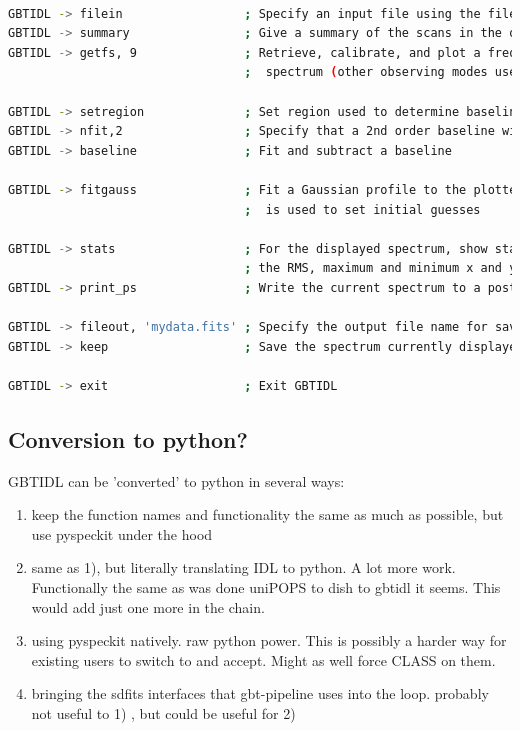 \documentclass[12pt,a4paper]{article}
\begin{document}
\begin{lstlisting}[language=bash]
% gbtidl                         ; Start GBTIDL from the unix prompt

GBTIDL -> filein                 ; Specify an input file using the file selection GUI
GBTIDL -> summary                ; Give a summary of the scans in the opened data file
GBTIDL -> getfs, 9               ; Retrieve, calibrate, and plot a frequency switched  
                                 ;  spectrum (other observing modes use different commands)

GBTIDL -> setregion              ; Set region used to determine baseline
GBTIDL -> nfit,2                 ; Specify that a 2nd order baseline will be used
GBTIDL -> baseline               ; Fit and subtract a baseline

GBTIDL -> fitgauss               ; Fit a Gaussian profile to the plotted spectrum.  The mouse
                                 ;  is used to set initial guesses

GBTIDL -> stats                  ; For the displayed spectrum, show statistics such as
                                 ; the RMS, maximum and minimum x and y values
GBTIDL -> print_ps               ; Write the current spectrum to a postscript file

GBTIDL -> fileout, 'mydata.fits' ; Specify the output file name for saved data
GBTIDL -> keep                   ; Save the spectrum currently displayed
		    
GBTIDL -> exit                   ; Exit GBTIDL

\end{lstlisting}

\subsection{Conversion to python?}

GBTIDL can be 'converted' to python in several ways:

\begin{enumerate}
\item
  keep the function names and functionality the same as much as possible,
    but use pyspeckit under the hood
\item
  same as 1), but literally  translating IDL to python. A lot more work.
  Functionally the same as  was done uniPOPS to dish to gbtidl it seems.
  This would add just one more in the chain.
\item
  using pyspeckit natively. raw python power. This is possibly a harder way for
  existing users to switch to and accept. Might as well force CLASS on them.
\item
  bringing the sdfits interfaces that gbt-pipeline uses into the loop.
probably not useful to 1) , but could be useful for 2)

\end{enumerate}
\end{document}

